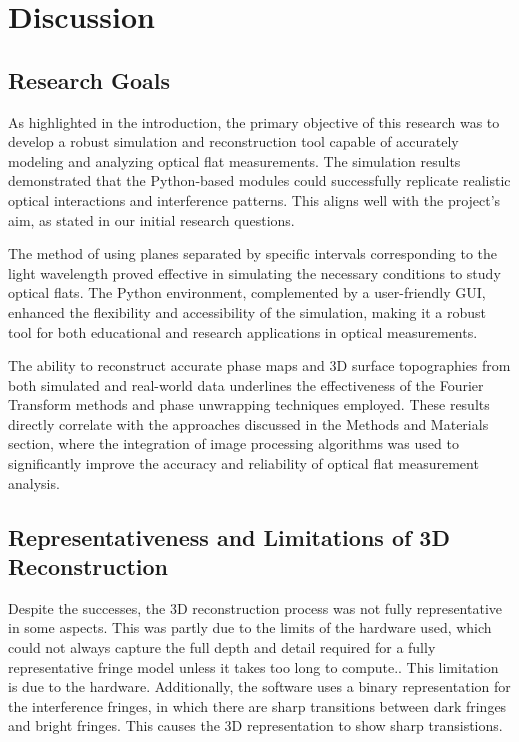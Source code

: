 \documentclass[../main.tex]{subfiles}
\begin{document}
{\let\clearpage\relax\chapter{Discussion}}

\section{Research Goals}
\vspace{-15pt}
As highlighted in the introduction, the primary objective of this research was to develop a robust simulation and reconstruction tool capable of accurately modeling and analyzing optical flat measurements. The simulation results demonstrated that the Python-based modules could successfully replicate realistic optical interactions and interference patterns. This aligns well with the project's aim, as stated in our initial research questions.

The method of using planes separated by specific intervals corresponding to the light wavelength proved effective in simulating the necessary conditions to study optical flats. The Python environment, complemented by a user-friendly GUI, enhanced the flexibility and accessibility of the simulation, making it a robust tool for both educational and research applications in optical measurements.

The ability to reconstruct accurate phase maps and 3D surface topographies from both simulated and real-world data underlines the effectiveness of the Fourier Transform methods and phase unwrapping techniques employed. These results directly correlate with the approaches discussed in the Methods and Materials section, where the integration of image processing algorithms was used to significantly improve the accuracy and reliability of optical flat measurement analysis.
\vspace{-15pt}
\section{Representativeness and Limitations of 3D Reconstruction}
\vspace{-15pt}
Despite the successes, the 3D reconstruction process was not fully representative in some aspects. This was partly due to the limits of the hardware used, which could not always capture the full depth and detail required for a fully representative fringe model unless it takes too long to compute.. This limitation is due to the hardware. Additionally, the software uses a binary representation for the interference fringes, in which there are sharp transitions between dark fringes and bright fringes. This causes the 3D representation to show sharp transistions.
\end{document}
